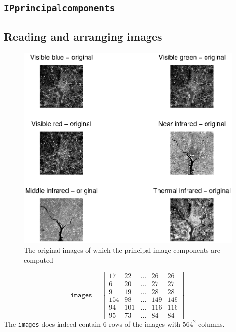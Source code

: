 \subsection{\texttt{IPprincipalcomponents}}
\subsection{Reading and arranging images}
\begin{figure}[htb]
 \centering
 \includegraphics[width=\linewidth]{original_pca.eps}
 \caption{The original images of which the principal image components are computed}
 \label{fig:original_pca}
\end{figure}
\[
\texttt{images} = \begin{bmatrix}
       17  & 22  & \ldots & 26  & 26   \\[0.3em]
       6   & 20  & \ldots & 27  & 27   \\[0.3em]
       9   & 19  & \ldots & 28  & 28   \\[0.3em]
       154 & 98  & \ldots & 149 & 149  \\[0.3em]     
       94  & 101 & \ldots & 116 & 116  \\[0.3em]
       95  & 73  & \ldots & 84  & 84  
\end{bmatrix}
\]
The \texttt{images} does indeed contain 6 rows of the images with \(564^2\) columns.
\clearpage
